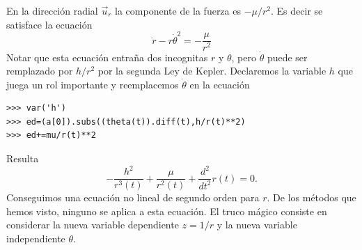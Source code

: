 En la dirección radial $\vec{u}_r$ la componente de la fuerza es $-\mu/r^2$. Es decir se satisface la ecuación
\[
\ddot{r}-r\dot{\theta}^2=-\frac{\mu}{r^2}
\]
Notar que esta ecuación entraña dos incognitas $r$ y $\theta$, pero $\dot{\theta}$ puede ser remplazado por $h/r^2$ por la segunda Ley de Kepler.
Declaremos la variable $h$ que juega un rol importante y reemplacemos $\dot{\theta}$ en la ecuación

\begin{lstlisting}
>>> var('h')
>>> ed=(a[0]).subs((theta(t)).diff(t),h/r(t)**2)
>>> ed+=mu/r(t)**2
\end{lstlisting}
Resulta
\[- \frac{h^{2}}{r^{3}{\left (t \right )}} + \frac{\mu}{r^{2}{\left (t \right )}} + \frac{d^{2}}{d t^{2}}  r{\left (t \right )}=0.
\]
Conseguimos una ecuación no lineal de segundo orden para $r$. De los métodos que hemos visto, ninguno se aplica a esta ecuación.
El truco mágico consiste en considerar la nueva variable dependiente $z=1/r$ y la nueva variable independiente
$\theta$.

